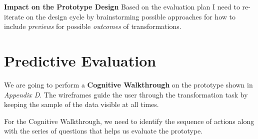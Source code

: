 \documentclass[12pt,letterpaper]{article}
\begin{document}
\textbf{Impact on the Prototype Design}
Based on the evaluation plan I need to re-iterate on the design cycle by brainstorming possible approaches for how to include \textit{previews} for possible \textit{outcomes} of transformations. 

\section*{Predictive Evaluation}

We are going to perform a \textbf{Cognitive Walkthrough} on the prototype shown in \textit{Appendix D}. The wireframes guide the user through the transformation task by keeping the sample of the data visible at all times. 

For the Cognitive Walkthrough, we need to identify the sequence of actions along with the series of questions that helps us evaluate the prototype.
\end{document}

